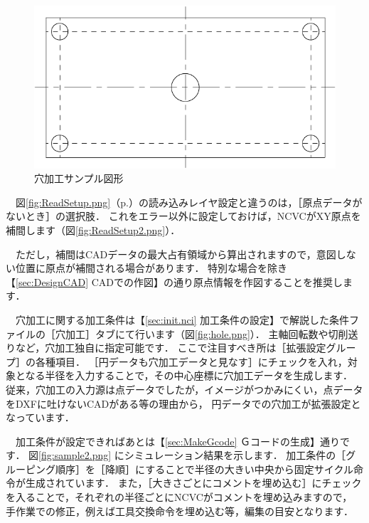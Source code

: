 \begin{figure}[H]
\centering
\includegraphics{No2/fig/sample2.pdf}
\caption{穴加工サンプル図形}
\label{fig:sample2.pdf}
\end{figure}

　図\ref{fig:ReadSetup.png}（p.\pageref{fig:ReadSetup.png}）の読み込みレイヤ設定と違うのは，［原点データがないとき］の選択肢．
これをエラー以外に設定しておけば，NCVCがXY原点を補間します（図\ref{fig:ReadSetup2.png}）．

　ただし，補間はCADデータの最大占有領域から算出されますので，意図しない位置に原点が補間される場合があります．
特別な場合を除き【\ref{sec:DesignCAD} CADでの作図】の通り原点情報を作図することを推奨します．

　穴加工に関する加工条件は【\ref{sec:init.nci} 加工条件の設定】で解説した条件ファイルの［穴加工］タブにて行います（図\ref{fig:hole.png}）．
主軸回転数や切削送りなど，穴加工独自に指定可能です．
ここで注目すべき所は［拡張設定グループ］の各種項目．
［円データも穴加工データと見なす］にチェックを入れ，対象となる半径を入力することで，その中心座標に穴加工データを生成します．
従来，穴加工の入力源は点データでしたが，イメージがつかみにくい，点データをDXFに吐けないCADがある等の理由から，
円データでの穴加工が拡張設定となっています．

\vspace*{2zh}
　加工条件が設定できればあとは【\ref{sec:MakeGcode} Ｇコードの生成】通りです．
図\ref{fig:sample2.png} にシミュレーション結果を示します．
加工条件の［グルーピング順序］を［降順］にすることで半径の大きい中央から固定サイクル命令が生成されています．
また，［大きさごとにコメントを埋め込む］にチェックを入ることで，それぞれの半径ごとにNCVCがコメントを埋め込みますので，
手作業での修正，例えば工具交換命令を埋め込む等，編集の目安となります．

